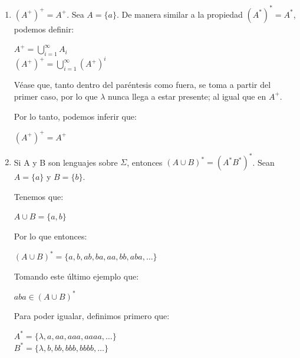 \begin{enumerate}
        Entonces:
        \begin{center}
            $\lambda \in (A^+)^0$ y $A^* = A^+ \cup \{\lambda\}$\\
        \end{center}
        
        Por lo tanto, podemos decir que:
        \begin{center}
            $\boxed{(A^+)^* = A^*}$
        \end{center}
    \item $(A^+)^+ = A^+$.
        \subitem Sea $A = \{a\}$. De manera similar a la propiedad $(A^*)^* = A^*$, podemos definir:
        
        \begin{center}
            $A^+ = \bigcup_{i=1}^{\infty}A_i$\\
            $(A^+)^+ = \bigcup_{i=1}^{\infty}(A^+)^i$
        \end{center}
        
        Véase que, tanto dentro del paréntesis como fuera, se toma a partir del primer caso, por lo que $\lambda$ nunca llega a estar presente; al igual que en $A^+$.
        
        Por lo tanto, podemos inferir que:
        \begin{center}
            $\boxed{(A^+)^+ = A^+}$
        \end{center}
    \newpage
    \item Si A y B son lenguajes sobre $\Sigma$, entonces $(A \cup B)^* = (A^* B^*)^*$.
        \subitem Sean $A = \{a\}$ y $B = \{b\}$.
        
        Tenemos que:
        \begin{center}
            $A \cup B = \{a,b\}$
        \end{center}
        
        Por lo que entonces:
        \begin{center}
            $(A \cup B)^* = \{a,b,ab,ba,aa,bb,aba,\ldots\}$
        \end{center}
        
        Tomando este último ejemplo que:
        \begin{center}
            $aba \in (A \cup B)^*$
        \end{center}
        
        Para poder igualar, definimos primero que:
        \begin{center}
            $A^* = \{\lambda,a,aa,aaa,aaaa,\ldots\}$\\
            $B^* = \{\lambda,b,bb,bbb,bbbb,\ldots\}$
        \end{center}
        

\end{enumerate}
